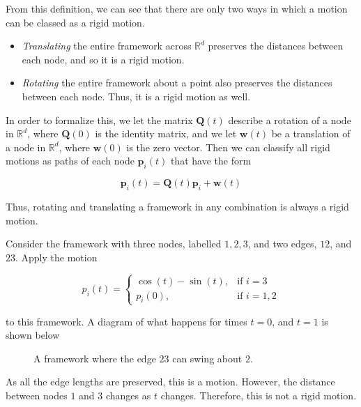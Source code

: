 \begin{flushleft}
From this definition, we can see that there are only two ways in which a motion can be classed as a rigid motion.     
\end{flushleft}

\begin{itemize}
    \item \textit{Translating} the entire framework across $\mathbb{R}^d$ preserves the distances between each node, and so it is a rigid motion.
    \vspace{-3mm}
    \item \textit{Rotating} the entire framework about a point also preserves the distances between each node. Thus, it is a rigid motion as well.
    
\end{itemize}

\begin{flushleft}
In order to formalize this, we let the matrix $\mathbf{Q}(t)$ describe a rotation of a node in $\mathbb{R}^d$, where $\mathbf{Q}(0)$ is the identity matrix, and we let $\mathbf{w}(t)$ be a translation of a node in $\mathbb{R}^d$, where $\mathbf{w}(0)$ is the zero vector. Then we can classify all rigid motions as paths of each node $\mathbf{p}_i(t)$ that have the form 

\[
\mathbf{p}_i(t) = \mathbf{Q}(t)\mathbf{p}_i + \mathbf{w}(t)
\]

\vspace{2mm}
Thus, rotating and translating a framework in any combination is always a rigid motion.
\end{flushleft}

\begin{example}
\label{eg: simple motion}
Consider the framework with three nodes, labelled $1,2,3$, and two edges, $12$, and $23$. Apply the motion 

\[ p_i(t) = 
\begin{cases}
    \cos(t) - \sin(t), & \text{if } i = 3 \\
    p_i(0), & \text{if } i = 1,2
\end{cases}
\]

\vspace{3 mm}
\noindent
to this framework. A diagram of what happens for times $t=0$, and $t=1$ is shown below

    \begin{figure}[htbp]
        \centering
        
        \caption{A framework where the edge $23$ can swing about $2$.}
        \label{fig: simple motion}
    \end{figure}
\vspace{-5 mm}
\begin{flushleft}
As all the edge lengths are preserved, this is a motion. However, the distance between nodes $1$ and $3$ changes as $t$ changes. Therefore, this is not a rigid motion.    
\end{flushleft}
\end{example}

